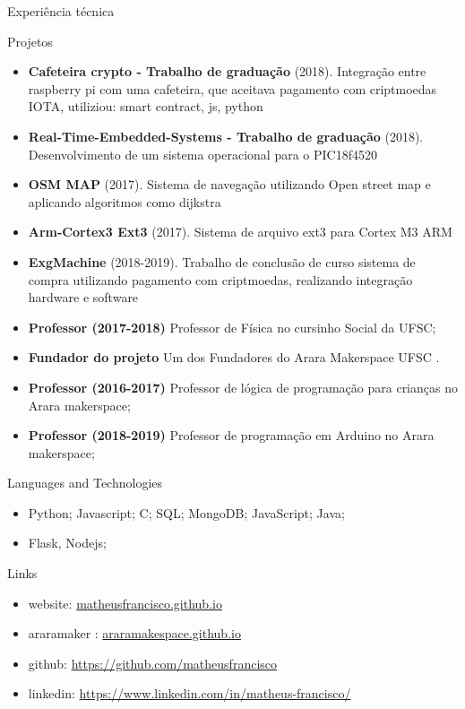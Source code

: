 \documentclass[]{mcdowellcv}
\begin{document}
	\begin{cvsection}{Experiência técnica}
		\begin{cvsubsection}{Projetos}{}{}
			\begin{itemize}
				\item \textbf{Cafeteira crypto - Trabalho de graduação} (2018). Integração entre raspberry pi com uma cafeteira, que aceitava pagamento com criptmoedas IOTA, utiliziou: smart contract, js, python
				\item \textbf{Real-Time-Embedded-Systems - Trabalho de graduação} (2018). Desenvolvimento de um sistema operacional para o  PIC18f4520
				\item \textbf{OSM MAP} (2017).  Sistema de navegação utilizando Open street map e aplicando algoritmos como  dijkstra
				\item \textbf{Arm-Cortex3 Ext3} (2017).  Sistema de arquivo ext3 para Cortex M3 ARM
				\item \textbf{ExgMachine} (2018-2019).  Trabalho de conclusão de curso sistema de compra utilizando pagamento com criptmoedas, realizando integração hardware e software
				\item \textbf{Professor (2017-2018)} Professor de Física no cursinho Social da UFSC;
				\item \textbf{Fundador do projeto} Um dos Fundadores do Arara Makerspace UFSC .
				\item \textbf{Professor (2016-2017)} Professor de lógica de programação para crianças no Arara makerspace;
				\item \textbf{Professor (2018-2019)} Professor de programação em Arduino no Arara makerspace;
			\end{itemize}
		\end{cvsubsection}
	\end{cvsection}
	
	
	\begin{cvsection}{Languages and Technologies}
		\begin{cvsubsection}{}{}{}	
			\begin{itemize}
				\item Python; Javascript; C; SQL; MongoDB; JavaScript; Java;
				\item Flask, Nodejs; 
			\end{itemize}
		\end{cvsubsection}
	\end{cvsection}

	\begin{cvsection}{Links}
		\begin{cvsubsection}{}{}{}	
			\begin{itemize}
				\item website: \url{matheusfrancisco.github.io}
				\item araramaker :  \url{araramakespace.github.io}
				\item github: \url{https://github.com/matheusfrancisco}
				\item linkedin: \url{https://www.linkedin.com/in/matheus-francisco/} 
			\end{itemize}
		\end{cvsubsection}
	\end{cvsection}
	
\end{document}
